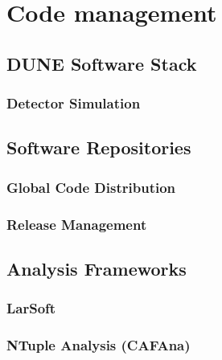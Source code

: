 %

\chapter{Code management} %
\section{DUNE Software Stack}
\subsection{Detector Simulation}
\section{Software Repositories}
\subsection{Global Code Distribution}
\subsection{Release Management}
\section{Analysis Frameworks}
\subsection{LarSoft}
\subsection{NTuple Analysis (CAFAna)}
